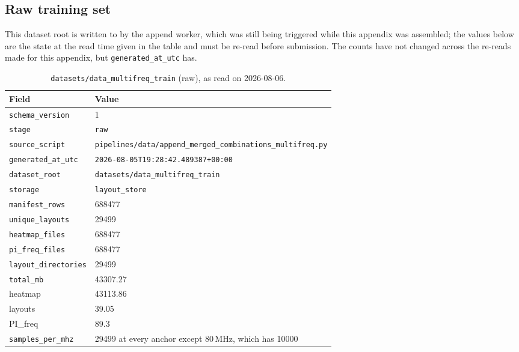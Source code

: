 \subsection{Raw training set}
\label{subsec:appA_raw_set}

This dataset root is written to by the append worker, which was still being triggered while this
appendix was assembled; the values below are the state at the read time given in the table and must
be re-read before submission. The counts have not changed across the re-reads made for this
appendix, but \texttt{generated\_at\_utc} has.

\begin{table}[htbp]
\centering
\caption{\texttt{datasets/data\_multifreq\_train} (raw), as read on 2026-08-06.}
\label{tab:appA_raw}
\begin{tabular}{p{} p{}}
\hline
Field & Value \\
\hline
\texttt{schema\_version} & 1 \\
\texttt{stage} & \texttt{raw} \\
\texttt{source\_script} &
\texttt{pipelines/\allowbreak{}data/\allowbreak{}append\_\allowbreak{}merged\_\allowbreak{}combinations\_\allowbreak{}multifreq.py} \\
\texttt{generated\_at\_utc} & \texttt{2026-08-05T19:28:42.489387+00:00} \\
\texttt{dataset\_root} & \texttt{\allowbreak datasets/data\_multifreq\_train} \\
\texttt{storage} & \texttt{layout\_store} \\
\texttt{manifest\_rows} & 688477 \\
\texttt{unique\_layouts} & 29499 \\
\texttt{heatmap\_files} & 688477 \\
\texttt{pi\_freq\_files} & 688477 \\
\texttt{layout\_directories} & 29499 \\
\texttt{total\_mb} & 43307.27 \\
\quad heatmap & 43113.86 \\
\quad layouts & 39.05 \\
\quad PI\_freq & 89.3 \\
\texttt{samples\_per\_mhz} & 29499 at every anchor except 80\,MHz, which has 10000 \\
\hline
\end{tabular}
\end{table}


